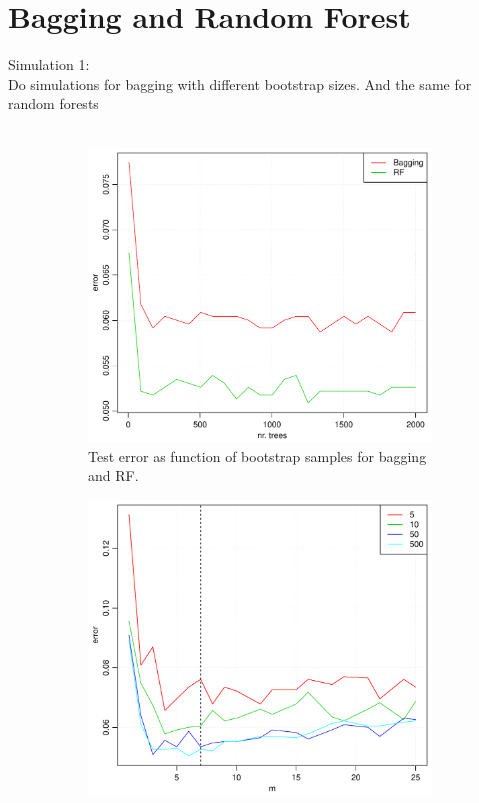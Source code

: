 \section{Bagging and Random Forest}
\label{sec:BaggandRFSim}
Simulation 1: \\
Do simulations for bagging with different bootstrap sizes. And the same for random forests\\
\\
\begin{figure}[h!]
  \centering
  \begin{subfigure}[b]{0.48\textwidth}
    \includegraphics[width=\textwidth]{./figures/baggingAndRFSpam.pdf}
    \caption{Test error as function of bootstrap samples for bagging and RF.}
    \label{fig:baggingAndRFSpam}
  \end{subfigure}%
  \quad
  \begin{subfigure}[b]{0.48\textwidth}
    \includegraphics[width=\textwidth]{./figures/RFSpam.pdf}

\end{subfigure}
\end{figure}
